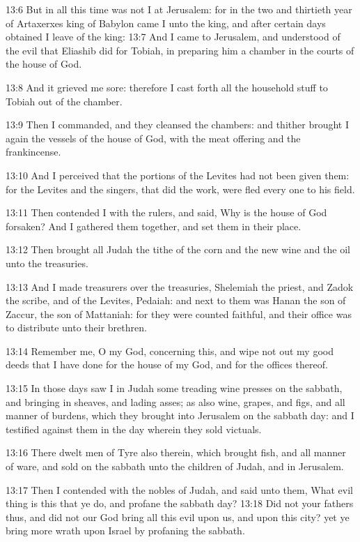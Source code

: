13:6 But in all this time was not I at Jerusalem: for in the two and thirtieth year of Artaxerxes king of Babylon came I unto the king, and after certain days obtained I leave of the king: 13:7 And I came to Jerusalem, and understood of the evil that Eliashib did for Tobiah, in preparing him a chamber in the courts of the house of God.

13:8 And it grieved me sore: therefore I cast forth all the household stuff to Tobiah out of the chamber.

13:9 Then I commanded, and they cleansed the chambers: and thither brought I again the vessels of the house of God, with the meat offering and the frankincense.

13:10 And I perceived that the portions of the Levites had not been given them: for the Levites and the singers, that did the work, were fled every one to his field.

13:11 Then contended I with the rulers, and said, Why is the house of God forsaken? And I gathered them together, and set them in their place.

13:12 Then brought all Judah the tithe of the corn and the new wine and the oil unto the treasuries.

13:13 And I made treasurers over the treasuries, Shelemiah the priest, and Zadok the scribe, and of the Levites, Pedaiah: and next to them was Hanan the son of Zaccur, the son of Mattaniah: for they were counted faithful, and their office was to distribute unto their brethren.

13:14 Remember me, O my God, concerning this, and wipe not out my good deeds that I have done for the house of my God, and for the offices thereof.

13:15 In those days saw I in Judah some treading wine presses on the sabbath, and bringing in sheaves, and lading asses; as also wine, grapes, and figs, and all manner of burdens, which they brought into Jerusalem on the sabbath day: and I testified against them in the day wherein they sold victuals.

13:16 There dwelt men of Tyre also therein, which brought fish, and all manner of ware, and sold on the sabbath unto the children of Judah, and in Jerusalem.

13:17 Then I contended with the nobles of Judah, and said unto them, What evil thing is this that ye do, and profane the sabbath day?  13:18 Did not your fathers thus, and did not our God bring all this evil upon us, and upon this city? yet ye bring more wrath upon Israel by profaning the sabbath.

